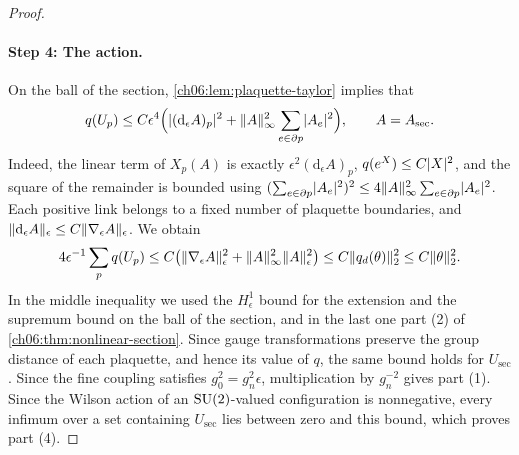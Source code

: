 \begin{proof}
\paragraph{Step 4: The action.}
On the ball of the section, \cref{ch06:lem:plaquette-taylor} implies that
\begin{equation}\label{ch06:eq:trial-plaquette-action}
 q(U_p)\le C\epsilon^4\Bigl(\lvert (\mathrm d_\epsilon A)_p\rvert^2+\lVert A\rVert_\infty^2\sum_{e\in\partial p}\lvert A_e\rvert^2\Bigr),\qquad A=A_{\mathrm{sec}}.
\end{equation}
Indeed, the linear term of $X_p(A)$ is exactly $\epsilon^2(\mathrm d_\epsilon A)_p$, $q(e^X)\le C\lvert X\rvert^2$, and the square of the remainder is bounded using $(\sum_{e\in\partial p}\lvert A_e\rvert^2)^2\le4\lVert A\rVert_\infty^2\sum_{e\in\partial p}\lvert A_e\rvert^2$. Each positive link belongs to a fixed number of plaquette boundaries, and $\lVert \mathrm d_\epsilon A\rVert_\epsilon\le C\lVert \nabla_\epsilon A\rVert_\epsilon$. We obtain
\begin{equation}\label{ch06:eq:trial-action-bound}
 4\epsilon^{-1}\sum_pq(U_p)\le C\bigl(\lVert \nabla_\epsilon A\rVert_\epsilon^2+\lVert A\rVert_\infty^2\lVert A\rVert_\epsilon^2\bigr)\le C\lVert q_d(\theta)\rVert_2^2\le C\lVert \theta\rVert_2^2.
\end{equation}
In the middle inequality we used the $H^1_\epsilon$ bound for the extension and the supremum bound on the ball of the section, and in the last one part (2) of \cref{ch06:thm:nonlinear-section}. Since gauge transformations preserve the group distance of each plaquette, and hence its value of $q$, the same bound holds for $U_{\mathrm{sec}}$. Since the fine coupling satisfies $g_0^2=g_n^2\epsilon$, multiplication by $g_n^{-2}$ gives part (1). Since the Wilson action of an $\mathrm{SU}(2)$-valued configuration is nonnegative, every infimum over a set containing $U_{\mathrm{sec}}$ lies between zero and this bound, which proves part (4).
\end{proof}

